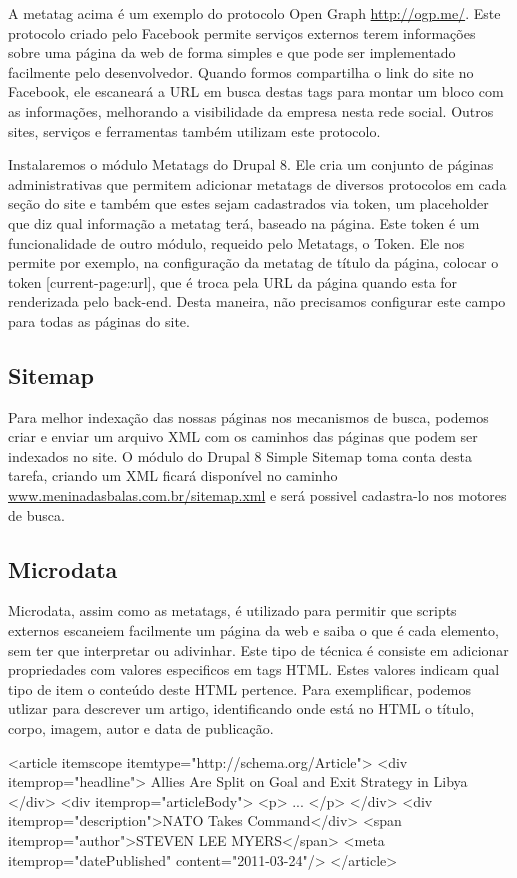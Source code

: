 A metatag acima é um exemplo do protocolo Open Graph \url{http://ogp.me/}. Este protocolo criado pelo Facebook permite serviços externos terem informações sobre uma página da web de forma simples e que pode ser implementado facilmente pelo desenvolvedor. Quando formos compartilha o link do site no Facebook, ele escaneará a URL em busca destas tags para montar um bloco com as informações, melhorando a visibilidade da empresa nesta rede social. Outros sites, serviços e ferramentas também utilizam este protocolo.

Instalaremos o módulo Metatags do Drupal 8. Ele cria um conjunto de páginas administrativas  que permitem adicionar metatags de diversos protocolos em cada seção do site e também que estes sejam cadastrados via token, um placeholder que diz qual informação a metatag terá, baseado na página. Este token é um funcionalidade de outro módulo, requeido pelo Metatags, o Token. Ele nos permite por exemplo, na configuração da metatag de título da página, colocar o token [current-page:url], que é troca pela URL da página quando esta for renderizada pelo back-end. Desta maneira, não precisamos configurar este campo para todas as páginas do site.

\subsection{Sitemap}
Para melhor indexação das nossas páginas nos mecanismos de busca, podemos criar e enviar um arquivo XML com os caminhos das páginas que podem ser indexados no site. O módulo do Drupal 8 Simple Sitemap toma conta desta tarefa, criando um XML ficará disponível no caminho \url{www.meninadasbalas.com.br/sitemap.xml} e será possivel cadastra-lo nos motores de busca.

\subsection{Microdata}
Microdata, assim como as metatags, é utilizado para permitir que scripts externos escaneiem facilmente um página da web e saiba o que é cada elemento, sem ter que interpretar ou adivinhar. Este tipo de técnica é consiste em adicionar propriedades com valores especificos em tags HTML. Estes valores indicam qual tipo de item o conteúdo deste HTML pertence. Para exemplificar, podemos utlizar para descrever um artigo, identificando onde está no HTML o título, corpo, imagem, autor e data de publicação.

\begin{center}
  <article itemscope itemtype="http://schema.org/Article">
    <div itemprop="headline">
      Allies Are Split on Goal and 
      Exit Strategy in Libya
    </div>
    <div itemprop="articleBody"> 
      <p> ... </p>
    </div>
    <div itemprop="description">NATO Takes Command</div> 
    <span itemprop="author">STEVEN LEE MYERS</span> 
    <meta itemprop="datePublished" content="2011-03-24"/>
  </article>
\end{center}

